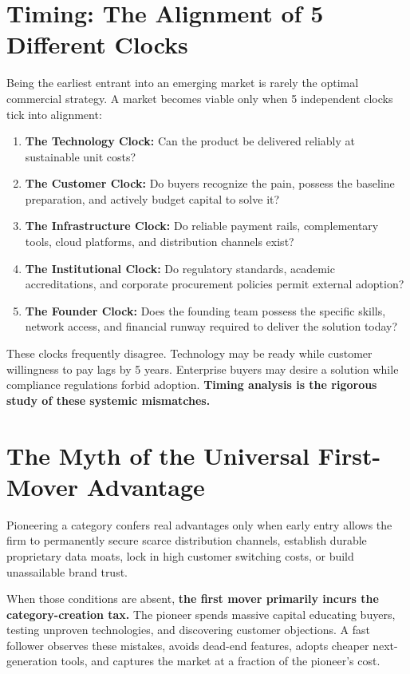 \section{Timing: The Alignment of 5 Different Clocks}

Being the earliest entrant into an emerging market is rarely the optimal commercial strategy. A market becomes viable only when 5 independent clocks tick into alignment:
\begin{enumerate}[leftmargin=12pt,itemsep=2pt,topsep=1pt,parsep=0pt]
  \item \textbf{The Technology Clock:} Can the product be delivered reliably at sustainable unit costs?
  \item \textbf{The Customer Clock:} Do buyers recognize the pain, possess the baseline preparation, and actively budget capital to solve it?
  \item \textbf{The Infrastructure Clock:} Do reliable payment rails, complementary tools, cloud platforms, and distribution channels exist?
  \item \textbf{The Institutional Clock:} Do regulatory standards, academic accreditations, and corporate procurement policies permit external adoption?
  \item \textbf{The Founder Clock:} Does the founding team possess the specific skills, network access, and financial runway required to deliver the solution today?
\end{enumerate}

These clocks frequently disagree. Technology may be ready while customer willingness to pay lags by 5 years. Enterprise buyers may desire a solution while compliance regulations forbid adoption. \textbf{Timing analysis is the rigorous study of these systemic mismatches.}

\section{The Myth of the Universal First-Mover Advantage}

Pioneering a category confers real advantages only when early entry allows the firm to permanently secure scarce distribution channels, establish durable proprietary data moats, lock in high customer switching costs, or build unassailable brand trust.

When those conditions are absent, \textbf{the first mover primarily incurs the category-creation tax.} The pioneer spends massive capital educating buyers, testing unproven technologies, and discovering customer objections. A fast follower observes these mistakes, avoids dead-end features, adopts cheaper next-generation tools, and captures the market at a fraction of the pioneer's cost.

